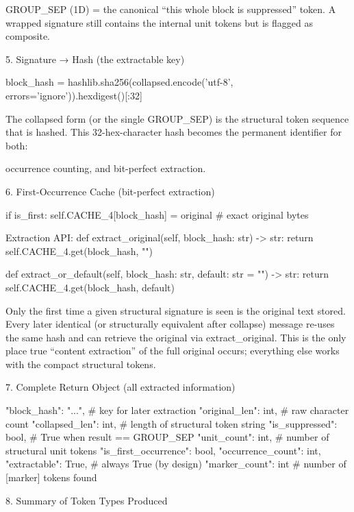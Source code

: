 GROUP_SEP (\x1D) = the canonical “this whole block is suppressed” token.  
A wrapped signature still contains the internal unit tokens but is flagged as composite.

5. Signature → Hash (the extractable key)

block_hash = hashlib.sha256(collapsed.encode('utf-8', errors='ignore')).hexdigest()[:32]

The collapsed form (or the single GROUP_SEP) is the structural token sequence that is hashed.  
This 32-hex-character hash becomes the permanent identifier for both:

occurrence counting, and  
bit-perfect extraction.

6. First-Occurrence Cache (bit-perfect extraction)

if is_first:
    self.CACHE_4[block_hash] = original     # exact original bytes

Extraction API:
def extract_original(self, block_hash: str) -> str:
    return self.CACHE_4.get(block_hash, "")

def extract_or_default(self, block_hash: str, default: str = "") -> str:
    return self.CACHE_4.get(block_hash, default)

Only the first time a given structural signature is seen is the original text stored.
Every later identical (or structurally equivalent after collapse) message re-uses the same hash and can retrieve the original via extract_original.
This is the only place true “content extraction” of the full original occurs; everything else works with the compact structural tokens.

7. Complete Return Object (all extracted information)

{
    "block_hash":          "...",          # key for later extraction
    "original_len":        int,            # raw character count
    "collapsed_len":       int,            # length of structural token string
    "is_suppressed":       bool,           # True when result == GROUP_SEP
    "unit_count":          int,            # number of structural unit tokens
    "is_first_occurrence": bool,
    "occurrence_count":    int,
    "extractable":         True,           # always True (by design)
    "marker_count":        int             # number of [marker] tokens found
}

8. Summary of Token Types Produced

